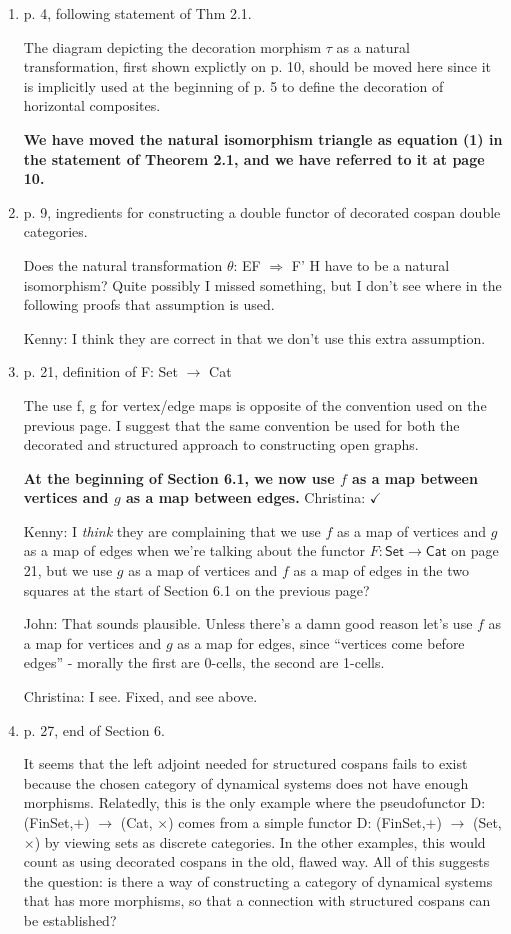 \documentclass[reqno]{amsart}
\def\chris{\color{purple} Christina: }
\def\john{\color{red} John: }
\def\kenny{\color{blue} Kenny: }
\begin{document}
\begin{enumerate}
{\chris Merge with at least 13.}

\item p. 4, following statement of Thm 2.1.

The diagram depicting the decoration morphism $\tau$ as a natural transformation, first shown explictly on p. 10, should be moved here since it is 
implicitly used at the beginning of p. 5 to define the decoration of horizontal composites.

{\bf We have moved the natural isomorphism triangle as equation (1) in the statement of Theorem 2.1, and we have referred to it at page 10.}

\item p. 9, ingredients for constructing a double functor of decorated cospan double categories.

Does the natural transformation $\theta$: EF $\Rightarrow$ F’ H have to be a natural isomorphism? Quite possibly I missed something, but I don’t see 
where in 
the following proofs that assumption is used.

{\kenny I think they are correct in that we don't use this extra assumption.}

\item p. 21, definition of F: Set $\to$ Cat

The use f, g for vertex/edge maps is opposite of the convention used on the previous page. I suggest that the same convention be used for both the 
decorated and structured approach to constructing open graphs.

{\bf At the beginning of Section 6.1, we now use $f$ as a map between vertices and $g$ as a map between edges.} {\chris $\checkmark$}

{\kenny I \emph{think} they are complaining that we use $f$ as a map of vertices and $g$ as a map of edges when we're talking about the functor $F \colon \mathsf{Set} \to \mathsf{Cat}$ on page 21, but we use $g$ as a map of vertices and $f$ as a map of edges in the two squares at the start of Section 6.1 on the previous page?}

{\john That sounds plausible.  Unless there's a damn good reason let's use $f$ as a map for vertices and $g$ as a map for edges, since ``vertices come 
before edges'' - morally the first are 0-cells, the second are 1-cells.}

{\chris I see. Fixed, and see above.}

\item p. 27, end of Section 6.

It seems that the left adjoint needed for structured cospans fails to exist because the chosen category of dynamical systems does not have enough 
morphisms. Relatedly, this is the only example where the pseudofunctor D: (FinSet,+) $\to$ (Cat, $\times$) comes from a simple functor D: (FinSet,+) 
$\to$ (Set, $\times$) by viewing sets as discrete categories. In the other examples, this would count as using decorated cospans in the old, flawed 
way. 
All of this suggests the question: is there a way of constructing a category of dynamical systems that has more morphisms, so that a connection with 
structured cospans can be established?


\end{enumerate}
\end{document}

